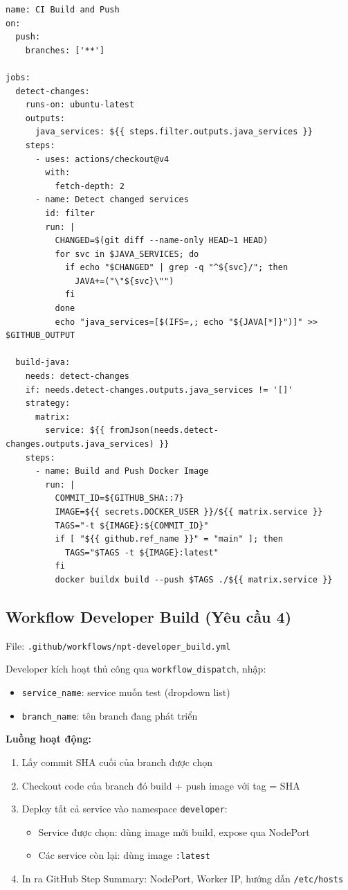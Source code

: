\begin{lstlisting}[style=yamlstyle, caption=CI workflow — detect changes và build (trích)]
name: CI Build and Push
on:
  push:
    branches: ['**']

jobs:
  detect-changes:
    runs-on: ubuntu-latest
    outputs:
      java_services: ${{ steps.filter.outputs.java_services }}
    steps:
      - uses: actions/checkout@v4
        with:
          fetch-depth: 2
      - name: Detect changed services
        id: filter
        run: |
          CHANGED=$(git diff --name-only HEAD~1 HEAD)
          for svc in $JAVA_SERVICES; do
            if echo "$CHANGED" | grep -q "^${svc}/"; then
              JAVA+=("\"${svc}\"")
            fi
          done
          echo "java_services=[$(IFS=,; echo "${JAVA[*]}")]" >> $GITHUB_OUTPUT

  build-java:
    needs: detect-changes
    if: needs.detect-changes.outputs.java_services != '[]'
    strategy:
      matrix:
        service: ${{ fromJson(needs.detect-changes.outputs.java_services) }}
    steps:
      - name: Build and Push Docker Image
        run: |
          COMMIT_ID=${GITHUB_SHA::7}
          IMAGE=${{ secrets.DOCKER_USER }}/${{ matrix.service }}
          TAGS="-t ${IMAGE}:${COMMIT_ID}"
          if [ "${{ github.ref_name }}" = "main" ]; then
            TAGS="$TAGS -t ${IMAGE}:latest"
          fi
          docker buildx build --push $TAGS ./${{ matrix.service }}
\end{lstlisting}

\subsection{Workflow Developer Build (Yêu cầu 4)}

File: \texttt{.github/workflows/npt-developer\_build.yml}

Developer kích hoạt thủ công qua \texttt{workflow\_dispatch}, nhập:
\begin{itemize}
	\item \texttt{service\_name}: service muốn test (dropdown list)
	\item \texttt{branch\_name}: tên branch đang phát triển
\end{itemize}

\textbf{Luồng hoạt động:}
\begin{enumerate}
	\item Lấy commit SHA cuối của branch được chọn
	\item Checkout code của branch đó \textrightarrow{} build + push image với tag = SHA
	\item Deploy tất cả service vào namespace \texttt{developer}:
	      \begin{itemize}
		      \item Service được chọn: dùng image mới build, expose qua NodePort
		      \item Các service còn lại: dùng image \texttt{:latest}
	      \end{itemize}
	\item In ra GitHub Step Summary: NodePort, Worker IP, hướng dẫn \texttt{/etc/hosts}
\end{enumerate}

